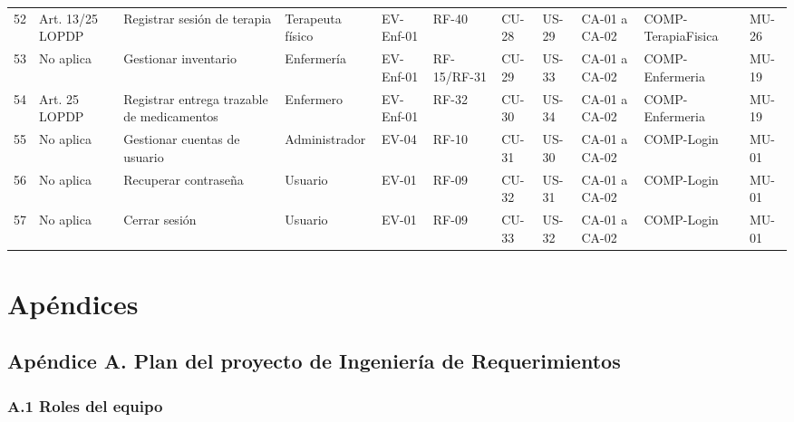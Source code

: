 \documentclass[11pt,a4paper]{article}
\begin{document}
\begin{longtable}{p{} p{} p{} p{} p{} p{} p{} p{} p{} p{} p{}}
		52 & Art. 13/25 LOPDP & Registrar sesión de terapia & Terapeuta físico & EV-Enf-01 & RF-40 & CU-28 & US-29 & CA-01 a CA-02 & COMP-TerapiaFisica & MU-26 \\
		53 & No aplica & Gestionar inventario & Enfermería & EV-Enf-01 & RF-15/RF-31 & CU-29 & US-33 & CA-01 a CA-02 & COMP-Enfermeria & MU-19 \\
		54 & Art. 25 LOPDP & Registrar entrega trazable de medicamentos & Enfermero & EV-Enf-01 & RF-32 & CU-30 & US-34 & CA-01 a CA-02 & COMP-Enfermeria & MU-19 \\
		55 & No aplica & Gestionar cuentas de usuario & Administrador & EV-04 & RF-10 & CU-31 & US-30 & CA-01 a CA-02 & COMP-Login & MU-01 \\
		56 & No aplica & Recuperar contraseña & Usuario & EV-01 & RF-09 & CU-32 & US-31 & CA-01 a CA-02 & COMP-Login & MU-01 \\
		57 & No aplica & Cerrar sesión & Usuario & EV-01 & RF-09 & CU-33 & US-32 & CA-01 a CA-02 & COMP-Login & MU-01 \\
		\bottomrule
		
	\end{longtable}
	\endgroup
	
	
	\section{Apéndices}
	
	\subsection{Apéndice A. Plan del proyecto de Ingeniería de Requerimientos}
	
	\subsubsection{A.1 Roles del equipo}
	
\end{document}
